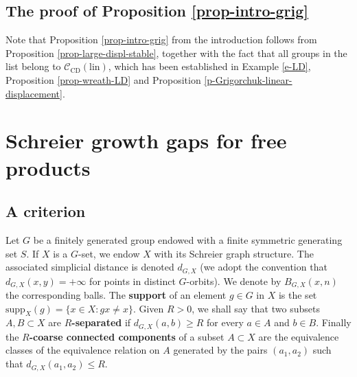 \documentclass[11pt]{amsart}
\newcommand{\supp}{\ensuremath{\textrm{supp}}}%
\newcommand{\Class}{\ensuremath{\mathcal{C}}}
\newcommand{\Clin}{\ensuremath{\mathcal{C}(\mathrm{lin})}}
\theoremstyle{definition}
\theoremstyle{plain}
\newtheorem{cor}[defin]{Corollary}
\theoremstyle{remark}
\begin{document}
\subsection{The proof of Proposition \ref{prop-intro-grig}} Note that Proposition \ref{prop-intro-grig} from the introduction follows from Proposition \ref{prop-large-displ-stable}, together with the fact that all groups in the list belong to $\Class_{\mathrm{CD}}(\mathrm{lin})$, which has been established in Example \ref{e-LD}, Proposition \ref{prop-wreath-LD} and Proposition \ref{p-Grigorchuk-linear-displacement}.




\section{Schreier growth gaps for free products} \label{sec-gap-free-prod}

\subsection{A criterion} Let $G$ be a finitely generated group endowed with a finite symmetric generating set $S$. If $X$ is a $G$-set, we endow $X$ with  its Schreier graph structure. The associated simplicial distance is denoted $d_{G, X}$ (we adopt the convention that $d_{G, X}(x, y)=+\infty$ for points in distinct $G$-orbits). We denote by $B_{G,X}(x, n)$ the corresponding balls. The \textbf{support} of an element $g\in G$ in $X$ is the set $\supp_X(g)=\{x\in X\colon g x \neq x\}$. Given $R>0$, we shall say that two subsets $A, B\subset X$ are \textbf{$R$-separated} if $d_{G,X}(a, b)\ge R$ for every $a\in A$ and $b\in B$. 
Finally the \textbf{$R$-coarse connected components} of a subset $A\subset X$ are the equivalence classes of the equivalence relation on $A$ generated by the pairs $(a_1, a_2)$ such that $d_{G,X}(a_1, a_2)\le R$.
\end{document}
